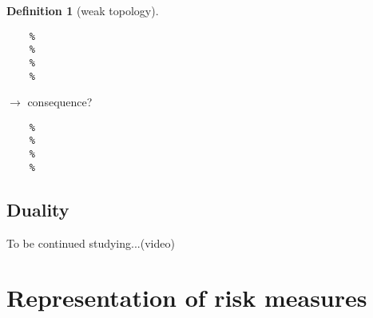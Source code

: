 \documentclass[letterpaper, 11pt]{article}
\newcommand{\1}{\mathds{1}}	%
\theoremstyle{definition}
\newtheorem{definition}[theorem]{Definition}
\begin{document}
\begin{definition}[weak topology]
\end{definition}
\begin{lstlisting}
    %
    %
    %
    %
\end{lstlisting}
$\rightarrow$ consequence?
\begin{lstlisting}
    %
    %
    %
    %
\end{lstlisting}

\newpage
\subsection{Duality}
To be continued studying...(video)


\section{Representation of risk measures}

\end{document}

